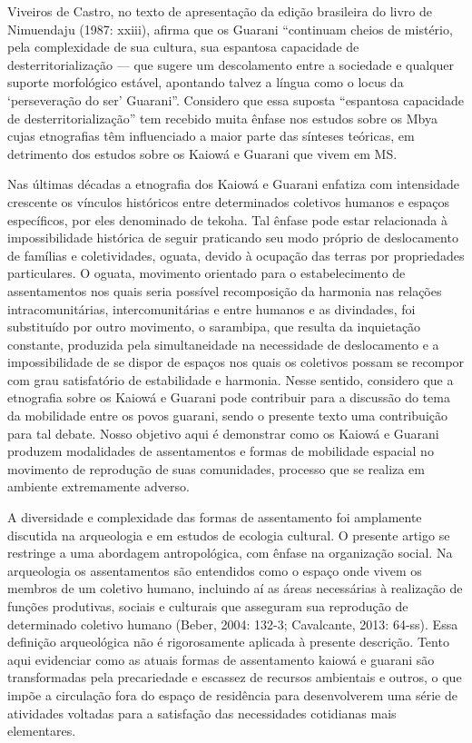 \documentclass{article}
\begin{document}
Viveiros de Castro, no texto de apresenta\c{c}\~ao da edi\c{c}\~ao
brasileira do livro de Nimuendaju (1987: xxiii), afirma que os Guarani
{\textquotedblleft}continuam cheios de mist\'erio, pela complexidade de
sua cultura, sua espantosa capacidade de desterritorializa\c{c}\~ao ---
que sugere um descolamento entre a sociedade e qualquer suporte
morfol\'ogico est\'avel, apontando talvez a l\'ingua como o locus da
{\textquoteleft}persevera\c{c}\~ao do ser{\textquoteright}
Guarani{\textquotedblright}. Considero que essa suposta
{\textquotedblleft}espantosa capacidade de
desterritorializa\c{c}\~ao{\textquotedblright} tem recebido muita
\^enfase nos estudos sobre os Mbya cujas etnografias t\^em influenciado
a maior parte das s\'inteses te\'oricas, em detrimento dos estudos
sobre os Kaiow\'a e Guarani que vivem em MS. 

Nas \'ultimas d\'ecadas a etnografia dos Kaiow\'a e Guarani enfatiza com
intensidade crescente os v\'inculos hist\'oricos entre determinados
coletivos humanos e espa\c{c}os espec\'ificos, por eles denominado de
tekoha. Tal \^enfase pode estar relacionada \`a impossibilidade
hist\'orica de seguir praticando seu modo pr\'oprio de deslocamento de
fam\'ilias e coletividades, oguata, devido \`a ocupa\c{c}\~ao das
terras por propriedades particulares. O oguata, movimento orientado
para o estabelecimento de assentamentos nos quais seria poss\'ivel
recomposi\c{c}\~ao da harmonia nas rela\c{c}\~oes intracomunit\'arias,
intercomunit\'arias e entre humanos e as divindades, foi substitu\'ido
por outro movimento, o sarambipa, que resulta da inquieta\c{c}\~ao
constante, produzida pela simultaneidade na necessidade de deslocamento
e a impossibilidade de se dispor de espa\c{c}os nos quais os coletivos
possam se recompor com grau satisfat\'orio de estabilidade e harmonia.
Nesse sentido, considero que a etnografia sobre os Kaiow\'a e Guarani
pode contribuir para a discuss\~ao do tema da mobilidade entre os povos
guarani, sendo o presente texto uma contribui\c{c}\~ao para tal debate.
Nosso objetivo aqui \'e demonstrar como os Kaiow\'a e Guarani produzem
modalidades de assentamentos e formas de mobilidade espacial no
movimento de reprodu\c{c}\~ao de suas comunidades, processo que se
realiza em ambiente extremamente adverso.

A diversidade e complexidade das formas de assentamento foi amplamente
discutida na arqueologia e em estudos de ecologia cultural. O presente
artigo se restringe a uma abordagem antropol\'ogica, com \^enfase na
organiza\c{c}\~ao social. Na arqueologia os assentamentos s\~ao
entendidos como o espa\c{c}o onde vivem os membros de um coletivo
humano, incluindo a\'i as \'areas necess\'arias \`a realiza\c{c}\~ao de
fun\c{c}\~oes produtivas, sociais e culturais que asseguram sua
reprodu\c{c}\~ao de determinado coletivo humano (Beber, 2004: 132-3;
Cavalcante, 2013: 64-ss). Essa defini\c{c}\~ao arqueol\'ogica n\~ao \'e
rigorosamente aplicada \`a presente descri\c{c}\~ao. Tento aqui
evidenciar como as atuais formas de assentamento kaiow\'a e guarani
s\~ao transformadas pela precariedade e escassez de recursos ambientais
e outros, o que imp\~oe a circula\c{c}\~ao fora do espa\c{c}o de
resid\^encia para desenvolverem uma s\'erie de atividades voltadas para
a satisfa\c{c}\~ao das necessidades cotidianas mais elementares. 
\end{document}

